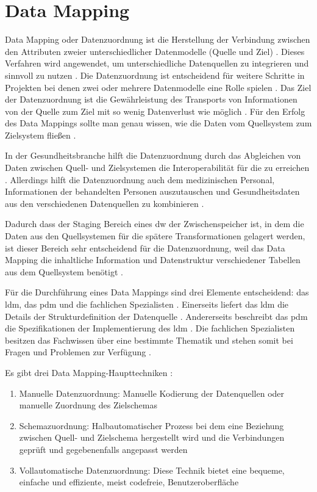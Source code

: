 \section{Data Mapping} \label{subsec:tbasub}

Data Mapping oder Datenzuordnung ist die Herstellung der Verbindung zwischen den Attributen zweier unterschiedlicher Datenmodelle (Quelle und Ziel) \cite{datamappingqs}. Dieses Verfahren wird angewendet, um unterschiedliche Datenquellen zu integrieren und sinnvoll zu nutzen \cite{datamappingastera}. Die Datenzuordnung ist entscheidend für weitere Schritte in Projekten bei denen zwei oder mehrere Datenmodelle eine Rolle spielen \cite{datamappingqs}. Das Ziel der Datenzuordnung ist die Gewährleistung des Transports von Informationen von der Quelle zum Ziel mit so wenig Datenverlust wie möglich \cite{datamappingastera}. Für den Erfolg des Data Mappings sollte man genau wissen, wie die Daten vom Quellsystem zum Zielsystem fließen \cite{datamappingqs}. 

In der Gesundheitsbranche hilft die Datenzuordnung durch das Abgleichen von Daten zwischen Quell- und Zielsystemen die Interoperabilität für die  zu erreichen \cite{interop, datamappingastera}. Allerdings hilft die Datenzuordnung auch dem medizinischen Personal, Informationen der behandelten Personen auszutauschen und Gesundheitsdaten aus den verschiedenen Datenquellen zu kombinieren \cite{datamappingastera}.

Dadurch dass der Staging Bereich eines \ac{dw} der Zwischenspeicher ist, in dem die Daten aus den Quellsystemen für die spätere Transformationen gelagert werden, ist dieser Bereich sehr entscheidend für die Datenzuordnung, weil das Data Mapping die inhaltliche Information und Datenstruktur verschiedener Tabellen aus dem Quellsystem benötigt \cite{datamappingqs, datawarehouse}.

Für die Durchführung eines Data Mappings sind drei Elemente entscheidend: das \ac{ldm}, das \ac{pdm} und die fachlichen Spezialisten \cite{datamappingqs}. Einerseits liefert das \ac{ldm} die Details der Strukturdefinition der Datenquelle \cite{datamappingqs, datamodel}. Andererseits beschreibt das \ac{pdm} die Spezifikationen der Implementierung des \ac{ldm} \cite{datamodel}. Die fachlichen Spezialisten besitzen das Fachwissen über eine bestimmte Thematik und stehen somit bei Fragen und Problemen zur Verfügung \cite{smeitlexicon}.

Es gibt drei Data Mapping-Haupttechniken \cite{datamappingastera}:
\begin{enumerate}
  \item Manuelle Datenzuordnung: Manuelle Kodierung der Datenquellen oder manuelle Zuordnung des Zielschemas
  \item Schemazuordnung: Halbautomatischer Prozess bei dem eine Beziehung zwischen Quell- und Zielschema hergestellt wird und die Verbindungen geprüft und gegebenenfalls angepasst werden
  \item Vollautomatische Datenzuordnung: Diese Technik bietet eine bequeme, einfache und effiziente, meist codefreie, Benutzeroberfläche
\end{enumerate}

